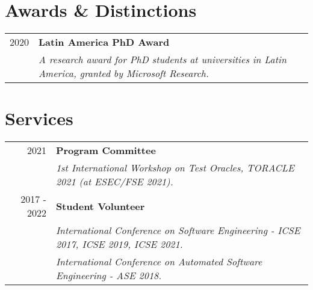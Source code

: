 \documentclass[a4paper,10pt]{article} %
\begin{document}


\section{Awards \& Distinctions}
\begin{longtable}{rl}

\textsc{2020} & \textbf{Latin America PhD Award} \\
& \textit{A research award for PhD students at universities in Latin America, granted by Microsoft Research.} \\

\end{longtable}

\section{Services}
\begin{longtable}{rl}
\textsc{2021}   & \textbf{Program Committee} \\
& \textit{1st International Workshop on Test Oracles, TORACLE 2021 (at ESEC/FSE 2021).} \\

\textsc{2017 - 2022} & \textbf{Student Volunteer} \\
& \textit{International Conference on Software Engineering - ICSE 2017, ICSE 2019, ICSE 2021.} \\
& \textit{International Conference on Automated Software Engineering - ASE 2018.} \\

\end{longtable}
\end{document}
